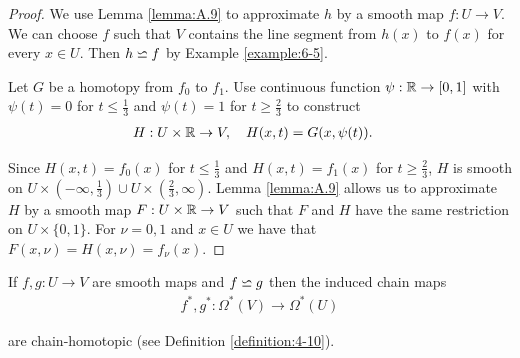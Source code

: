 \begin{proof}
  We use Lemma \ref{lemma:A.9} to approximate $h$ by a smooth map $f:U\to V$. We
can choose $f$ such that $V$ contains the line segment from $h(x)$ to $f(x)$ for every
$x\in U$. Then $h\backsimeq f$ by Example \ref{example:6-5}.

Let $G$ be a homotopy from $f_0$ to $f_1$. Use continuous function $\psi:{\mathbb{R}}\to[0, 1]$ with 
$\psi(t) = 0$ for $t\le \frac13$ and $\psi(t) = 1$ for $t\ge \frac23$ to construct 
\begin{align*}
  H:U\times{\ensuremath{\mathbb{R}}} &\to V, \quad H(x, t) = G(x, \psi(t)).
\end{align*}

Since $H(x, t) = f_0(x)$ for $t\le\frac13$ and $H(x, t) = f_1(x)$ for $t\ge\frac23$, $H$ is smooth 
on $U\times(-\infty,\tfrac13)\cup U\times(\frac23, \infty)$. Lemma \ref{lemma:A.9} allows us to approximate $H$ by a smooth map 
$F:U\times{\ensuremath{\mathbb{R}}}\to V$ such that $F$ and $H$ have the same restriction on $U\times\{0, 1\}$. For $\nu=0, 1$ and $x\in U$
we have that $F(x, \nu) = H(x, \nu) = f_\nu(x)$.
\end{proof}



\begin{theorem}\label{theorem:6-7}
If $f, g:U\to V$ are smooth maps and $f\backsimeq g$ then the induced chain maps 
\begin{align*}
  f^*,g^*:\Omega^*(V)\to \Omega^*(U)
\end{align*}

are chain-homotopic (see Definition \ref{definition:4-10}).
\end{theorem}

